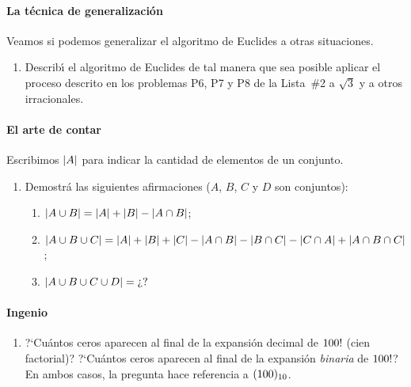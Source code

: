 \paragraph{La t\'ecnica de generalizaci\'on}
Veamos si podemos generalizar el algoritmo de Euclides a otras situaciones.
\begin{enumerate}[label=P\arabic*]
	\conti
	\item\label{item:generalizacion}
		Describ\'{\i} el algoritmo de Euclides de tal manera
		que sea posible aplicar el proceso descrito en los
		problemas P6, P7 y P8 de la Lista~\#2 a $\sqrt 3$ y
		a otros irracionales.
	\seti
\end{enumerate}
%

\paragraph{El arte de contar}
Escribimos $\indice A$ para indicar la cantidad de elementos de un
conjunto.
\begin{enumerate}[label=P\arabic*]
	\conti
	\item\label{item:conjuntos}
		Demostr\'a las siguientes afirmaciones ($A$, $B$,
		$C$ y $D$ son conjuntos):
		\begin{enumerate}[label=(\alph*)]
			\item
				\begin{math}
					\indice{A\cup B}=
					\indice A+\indice B
						-\indice{A\cap B}
				\end{math};
			\item
				\begin{math}
					\indice{A\cup B\cup C}=
					\indice A+\indice B+\indice C
						-\indice{A\cap B}
						-\indice{B\cap C}
						-\indice{C\cap A}
					+\indice{A\cap B\cap C}
				\end{math};
			\item
				\begin{math}
					\indice{A\cup B\cup C\cup D}=
					\text{?`?}
				\end{math}
		\end{enumerate}
	\seti
\end{enumerate}
%

\paragraph{Ingenio}
\begin{enumerate}[label=P\arabic*]
	\conti
	\item\label{item:factorial}
		?`Cu\'antos ceros aparecen al final de la expansi\'on
		decimal de $\factorial{100}$ (cien factorial)?
		?`Cu\'antos ceros aparecen al final de la expansi\'on
		\emph{binaria} de $\factorial{100}$? En ambos casos,
		la pregunta hace referencia a $\enbase{10}{100}$.
\end{enumerate}
%

